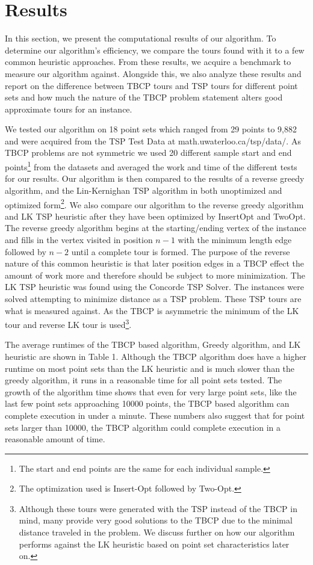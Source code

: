 \documentclass[sigconf, anonymous, pdftex]{acmart}
\begin{document}
\section{Results}

In this section, we present the computational results of our algorithm. To determine our algorithm's efficiency, we compare the tours found with it to a few common heuristic approaches. From these results, we acquire a benchmark to measure our algorithm against. Alongside this, we also analyze these results and report on the difference between TBCP tours and TSP tours for different point sets and how much the nature of the TBCP problem statement alters good approximate tours for an instance.

We tested our algorithm on 18 point sets which ranged from 29 points to 9,882 and were acquired from the TSP Test Data at  math.uwaterloo.ca/tsp/data/. As TBCP problems are not symmetric we used 20 different sample start and end points\footnote{The start and end points are the same for each individual sample.} from the datasets and averaged the work and time of the different tests for our results. Our algorithm is then compared to the results of a reverse greedy algorithm, and the Lin-Kernighan TSP algorithm in both unoptimized and optimized form\footnote{The optimization used is Insert-Opt followed by Two-Opt.}. We also compare our algorithm to the reverse greedy algorithm and LK TSP heuristic after they have been optimized by InsertOpt and TwoOpt. The reverse greedy algorithm begins at the starting/ending vertex of the instance and fills in the vertex visited in position $n-1$ with the minimum length edge followed by $n-2$ until a complete tour is formed. The purpose of the reverse nature of this common heuristic is that later position edges in a TBCP effect the amount of work more and therefore should be subject to more minimization. The LK TSP heuristic was found using the Concorde TSP Solver. The instances were solved attempting to minimize distance as a TSP problem. These TSP tours are what is measured against. As the TBCP is asymmetric the minimum of the LK tour and reverse LK tour is used\footnote{Although these tours were generated with the TSP instead of the TBCP in mind, many provide very good solutions to the TBCP due to the minimal distance traveled in the problem. We discuss further on how our algorithm performs against the LK heuristic based on point set characteristics later on.}.

The average runtimes of the TBCP based algorithm, Greedy algorithm, and LK heuristic are shown in Table 1. Although the TBCP algorithm does have a higher runtime on most point sets than the LK heuristic and is much slower than the greedy algorithm, it runs in a reasonable time for all point sets tested. The growth of the algorithm time shows that even for very large point sets, like the last few point sets approaching 10000 points, the TBCP based algorithm can complete execution in under a minute. These numbers also suggest that for point sets larger than 10000, the TBCP algorithm could complete execution in a reasonable amount of time.
\end{document}
